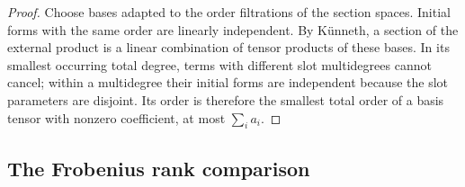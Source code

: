 \begin{proof}
Choose bases adapted to the order filtrations of the section spaces.
Initial forms with the same order are linearly independent. By
K\"unneth, a section of the external product is a linear combination
of tensor products of these bases. In its smallest occurring total
degree, terms with different slot multidegrees cannot cancel; within
a multidegree their initial forms are independent because the slot
parameters are disjoint. Its order is therefore the smallest total
order of a basis tensor with nonzero coefficient, at most
$\sum_i a_i$.
\end{proof}

\subsection{The Frobenius rank comparison}

